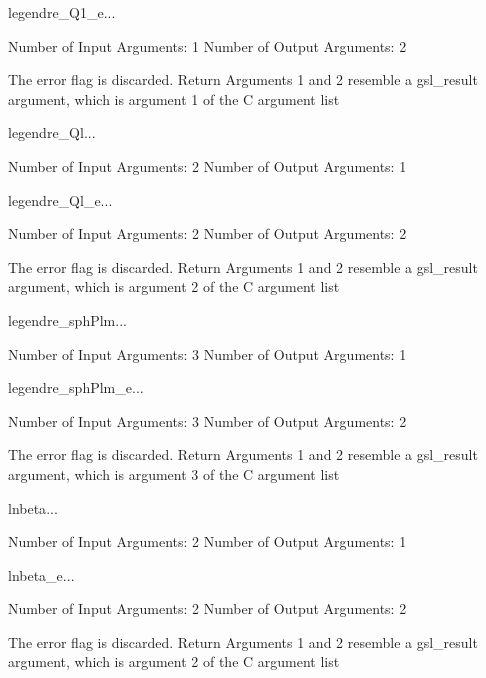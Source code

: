 \begin{funcdesc}{legendre_Q1_e}{...}

    Number of Input  Arguments:  1
    Number of Output Arguments:  2

The error flag is discarded.
Return Arguments 1 and 2 resemble a gsl_result argument,
	which is  argument 1 of the C argument list

\end{funcdesc}

\begin{funcdesc}{legendre_Ql}{...}

    Number of Input  Arguments:  2
    Number of Output Arguments:  1
\end{funcdesc}

\begin{funcdesc}{legendre_Ql_e}{...}

    Number of Input  Arguments:  2
    Number of Output Arguments:  2

The error flag is discarded.
Return Arguments 1 and 2 resemble a gsl_result argument,
	which is  argument 2 of the C argument list

\end{funcdesc}

\begin{funcdesc}{legendre_sphPlm}{...}

    Number of Input  Arguments:  3
    Number of Output Arguments:  1
\end{funcdesc}

\begin{funcdesc}{legendre_sphPlm_e}{...}

    Number of Input  Arguments:  3
    Number of Output Arguments:  2

The error flag is discarded.
Return Arguments 1 and 2 resemble a gsl_result argument,
	which is  argument 3 of the C argument list

\end{funcdesc}

\begin{funcdesc}{lnbeta}{...}

    Number of Input  Arguments:  2
    Number of Output Arguments:  1
\end{funcdesc}

\begin{funcdesc}{lnbeta_e}{...}

    Number of Input  Arguments:  2
    Number of Output Arguments:  2

The error flag is discarded.
Return Arguments 1 and 2 resemble a gsl_result argument,
	which is  argument 2 of the C argument list

\end{funcdesc}

